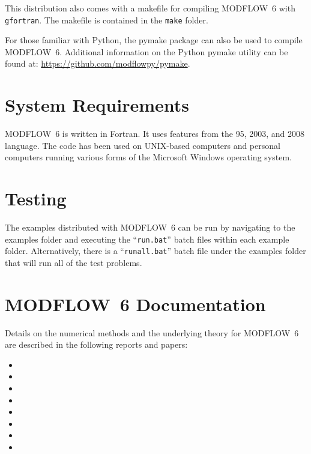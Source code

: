 \documentclass[11pt,twoside,twocolumn]{usgsreport}
\begin{document}
This distribution also comes with a makefile for compiling MODFLOW~6 with \texttt{gfortran}.  The makefile is contained in the \texttt{make} folder.

For those familiar with Python, the pymake package can also be used to compile MODFLOW~6.  Additional information on the Python pymake utility can be found at: \url{https://github.com/modflowpy/pymake}.  

\section{System Requirements}
MODFLOW~6 is written in Fortran.  It uses features from the 95, 2003, and 2008 language.  The code has been used on UNIX-based computers and personal computers running various forms of the Microsoft Windows operating system.

\section{Testing}
The examples distributed with MODFLOW~6 can be run by navigating to the examples folder and executing the ``\texttt{run.bat}'' batch files within each example folder.  Alternatively, there is a ``\texttt{runall.bat}'' batch file under the examples folder that will run all of the test problems.

\section{MODFLOW~6 Documentation}
Details on the numerical methods and the underlying theory for MODFLOW~6 are described in the following reports and papers:

\begin{itemize}

\item {}

\item {}

\item {}

\item {}

\item {}

\item {}

\item {}

\item {}

\end{itemize}
 
\end{document}

